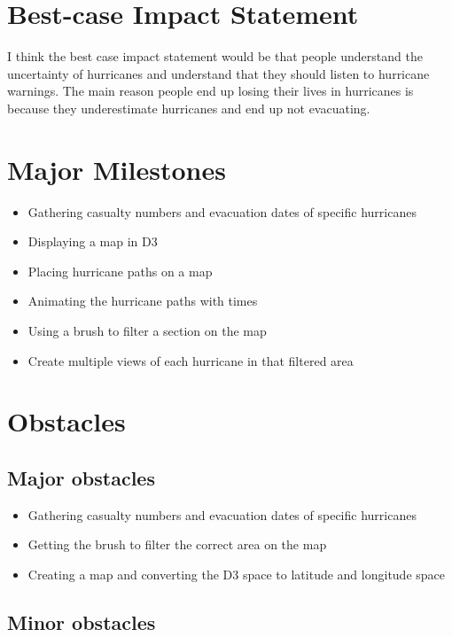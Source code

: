 \documentclass{proc}
\begin{document}
\section{Best-case Impact Statement}

I think the best case impact statement would be that people understand the uncertainty of hurricanes and understand that they should listen to hurricane warnings. The main reason people end up losing their lives in hurricanes is because they underestimate hurricanes and end up not evacuating. 

\section{Major Milestones}

\begin{itemize}
\item Gathering casualty numbers and evacuation dates of specific hurricanes 
\item Displaying a map in D3
\item Placing hurricane paths on a map
\item Animating the hurricane paths with times
\item Using a brush to filter a section on the map
\item Create multiple views of each hurricane in that filtered area
\end{itemize}

\section{Obstacles}

\subsection{Major obstacles} %

\begin{itemize}
\item Gathering casualty numbers and evacuation dates of specific hurricanes
\item Getting the brush to filter the correct area on the map
\item Creating a map and converting the D3 space to latitude and longitude space
\end{itemize}

\subsection{Minor obstacles}
\end{document}
